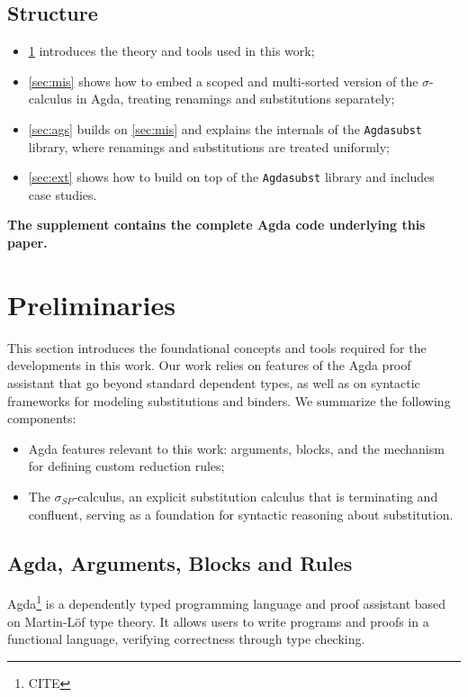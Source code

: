 \documentclass[screen,nonacm]{acmart}
\begin{document}
\subsection*{Structure}

\begin{itemize}
      \item \cref{sec:pre} introduces the theory and tools used in this work;
      \item \cref{sec:mis} shows how to embed a scoped and multi-sorted version of the $\sigma$-calculus in Agda, treating renamings and substitutions separately;
      \item \cref{sec:ags} builds on \cref{sec:mis} and explains the internals of the \texttt{Agdasubst} library, where renamings and substitutions are treated uniformly;
      \item \cref{sec:ext} shows how to build on top of the \texttt{Agdasubst} library and includes case studies.
\end{itemize}

\textbf{The supplement contains the complete Agda code underlying this paper.}

\section{Preliminaries}\label{sec:pre}
This section introduces the foundational concepts and tools required for the
developments in this work. Our work relies on features of the Agda proof
assistant that go beyond standard dependent types, as well as on syntactic
frameworks for modeling substitutions and binders. We summarize the following
components:

\begin{itemize}
      \item Agda features relevant to this work:  arguments,
             blocks, and the  mechanism for
            defining custom reduction rules;
      \item The $\sigma_{SP}$-calculus, an explicit substitution calculus that is
            terminating and confluent, serving as a foundation for syntactic reasoning
            about substitution.
\end{itemize}

\subsection{Agda,  Arguments,  Blocks and 
      Rules}\label{sec:pre-agd} Agda\footnote{CITE} is a dependently typed
programming language and proof assistant based on Martin-Löf type theory. It
allows users to write programs and proofs in a functional language, verifying
correctness through type checking.
\end{document}
